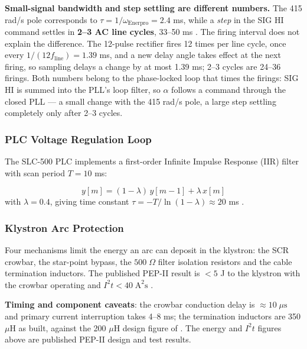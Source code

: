 \begin{keynote}
\textbf{Small-signal bandwidth and step settling are different numbers.} The 415 rad/s pole corresponds to \(\tau = 1/\omega_\text{Enerpro} = 2.4\) ms, while a \emph{step} in the SIG HI command settles in \textbf{2--3 AC line cycles}, 33--50 ms . The firing interval does not explain the difference. The 12-pulse rectifier fires 12 times per line cycle, once every \(1/(12 f_\text{line}) = 1.39\) ms, and a new delay angle takes effect at the next firing, so sampling delays a change by at most 1.39 ms; 2--3 cycles are 24--36 firings. Both numbers belong to the phase-locked loop that times the firings: SIG HI is summed into the PLL's loop filter, so \(\alpha\) follows a command through the closed PLL --- a small change with the 415 rad/s pole, a large step settling completely only after 2--3 cycles.
\end{keynote}

\subsubsection{PLC Voltage Regulation Loop}\label{sec:hvps-plc}


The SLC-500 PLC implements a first-order Infinite Impulse Response (IIR) filter with scan period \(T = 10\) ms:

\begin{equation}\label{eq:plc-iir}
y[m] = (1-\lambda)\,y[m-1] + \lambda\,x[m]
\end{equation}
with \(\lambda = 0.4\), giving time constant \(\tau = -T/\ln(1-\lambda) \approx 20\) ms .

\subsubsection{Klystron Arc Protection}\label{sec:hvps-arc}


Four mechanisms limit the energy an arc can deposit in the klystron: the SCR crowbar, the star-point bypass, the \(500\;\Omega\) filter isolation resistors and the cable termination inductors. The published PEP-II result is \(< 5\) J to the klystron with the crowbar operating and \(I^2 t < 40\;\text{A}^2\text{s}\) .

\begin{keynote}
\textbf{Timing and component caveats}: the crowbar conduction delay is \(\approx 10\;\mu\text{s}\) and primary current interruption takes 4--8 ms; the termination inductors are 350 \(\mu\)H as built, against the 200 \(\mu\)H design figure of . The energy and \(I^2t\) figures above are published PEP-II design and test results.
\end{keynote}

